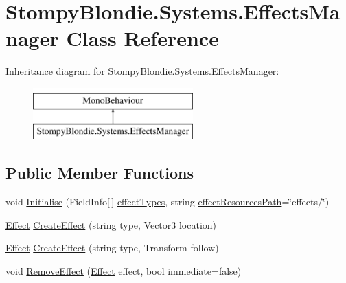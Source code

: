 \hypertarget{class_stompy_blondie_1_1_systems_1_1_effects_manager}{}\section{Stompy\+Blondie.\+Systems.\+Effects\+Manager Class Reference}
\label{class_stompy_blondie_1_1_systems_1_1_effects_manager}
Inheritance diagram for Stompy\+Blondie.\+Systems.\+Effects\+Manager\+:\begin{figure}[H]
\begin{center}
\leavevmode
\includegraphics[height=2.000000cm]{class_stompy_blondie_1_1_systems_1_1_effects_manager}
\end{center}
\end{figure}
\subsection*{Public Member Functions}
\begin{DoxyCompactItemize}
\item 
void \mbox{\hyperlink{class_stompy_blondie_1_1_systems_1_1_effects_manager_a168066de1a7b2fb68fe1e8aad700e095}{Initialise}} (Field\+Info\mbox{[}$\,$\mbox{]} \mbox{\hyperlink{class_stompy_blondie_1_1_systems_1_1_effects_manager_a185cf6e4134d962c94b3ea7e39355339}{effect\+Types}}, string \mbox{\hyperlink{class_stompy_blondie_1_1_systems_1_1_effects_manager_a9e917930d6e328a83cb87639ac1b3599}{effect\+Resources\+Path}}=\char`\"{}effects/\char`\"{})
\item 
\mbox{\hyperlink{class_stompy_blondie_1_1_systems_1_1_effect}{Effect}} \mbox{\hyperlink{class_stompy_blondie_1_1_systems_1_1_effects_manager_ac8421abe668767bdca76cfdcc61fc398}{Create\+Effect}} (string type, Vector3 location)
\item 
\mbox{\hyperlink{class_stompy_blondie_1_1_systems_1_1_effect}{Effect}} \mbox{\hyperlink{class_stompy_blondie_1_1_systems_1_1_effects_manager_ab75dc8e99a16fa5950b1e7e95d41f810}{Create\+Effect}} (string type, Transform follow)
\item 
void \mbox{\hyperlink{class_stompy_blondie_1_1_systems_1_1_effects_manager_a904acd1941627e0cb611586d220179a9}{Remove\+Effect}} (\mbox{\hyperlink{class_stompy_blondie_1_1_systems_1_1_effect}{Effect}} effect, bool immediate=false)
\end{DoxyCompactItemize}
